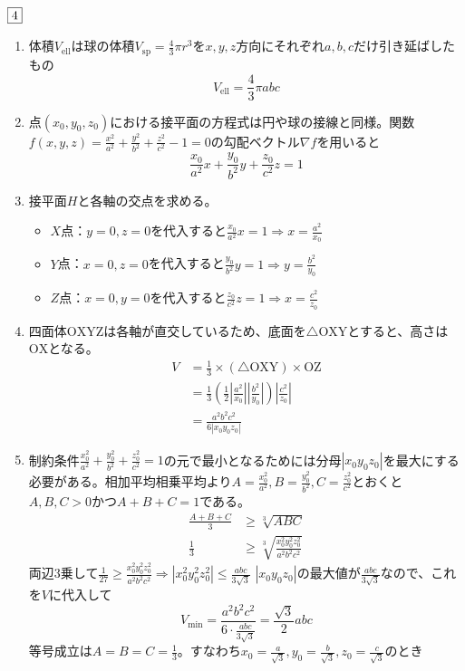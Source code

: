 \begin{souanswer} %
	$\fbox{4}$
\begin{enumerate}
	\item 体積$V_\mathrm{ell}$は球の体積$V_\mathrm{sp}= \frac{4}{3}\pi r^3$を$x, y, z$方向にそれぞれ$a, b, c$だけ引き延ばしたもの
\begin{equation*}
	V_\mathrm{ell}= \frac{4}{3}\pi abc
\end{equation*}

	\item 点$(x_0, y_0, z_0)$における接平面の方程式は円や球の接線と同様。関数$f(x, y, z)= \frac{x^2}{a^2}+ \frac{y^2}{b^2}+ \frac{z^2}{c^2}-1= 0$の勾配ベクトル$\nabla f$を用いると
\begin{equation*}
	\frac{x_0}{a^2}x+ \frac{y_0}{b^2}y+ \frac{z_0}{c^2}z= 1
\end{equation*}

	\item 接平面$H$と各軸の交点を求める。
\begin{itemize}
	\item $X$点：$y= 0, z= 0$を代入すると$\frac{x_0}{a^2}x= 1\Rightarrow x= \frac{a^2}{x_0}$
	\item $Y$点：$x= 0, z= 0$を代入すると$\frac{y_0}{b^2}y= 1\Rightarrow y= \frac{b^2}{y_0}$
	\item $Z$点：$x= 0, y= 0$を代入すると$\frac{z_0}{c^2}z= 1\Rightarrow x= \frac{c^2}{z_0}$
\end{itemize}

	\item 四面体$\mathrm{OXYZ}$は各軸が直交しているため、底面を$\triangle\mathrm{OXY}$とすると、高さは$\mathrm{OX}$となる。
\begin{align*}
	V
	&= \frac{1}{3}\times (\triangle\mathrm{OXY})\times \mathrm{OZ}\\
	&= \frac{1}{3}\left(\frac{1}{2}\left|\frac{a^2}{x_0}\right|\left|\frac{b^2}{y_0}\right|\right)\left|\frac{c^2}{z_0}\right|\\
	&= \frac{a^2b^2c^2}{6|x_0y_0z_0|}
\end{align*}

	\item 制約条件$\frac{x_0^2}{a^2}+ \frac{y_0^2}{b^2}+ \frac{z_0^2}{c^2}= 1$の元で最小となるためには分母$|x_0y_0z_0|$を最大にする必要がある。相加平均相乗平均より$A= \frac{x_0^2}{a^2}, B= \frac{y_0^2}{b^2}, C= \frac{z_0^2}{c^2}$とおくと$A, B, C> 0$かつ$A+ B+ C= 1$である。
\begin{align*}
	\frac{A+ B+ C}{3}&\ge \sqrt[3]{ABC}\\
	\frac{1}{3}&\ge \sqrt[3]{\frac{x_0^2y_0^2z_0^2}{a^2b^2c^2}}
\end{align*}
	両辺3乗して$\frac{1}{27}\ge \frac{x_0^2y_0^2z_0^2}{a^2b^2c^2}\Rightarrow |x_0^2y_0^2z_0^2|\le \frac{abc}{3\sqrt{3}}$
	$|x_0y_0z_0|$の最大値が$\frac{abc}{3\sqrt{3}}$なので、これを$V$に代入して
\begin{equation*}
	V_\mathrm{min}= \frac{a^2b^2c^2}{6\cdot \frac{abc}{3\sqrt{3}}}= \frac{\sqrt{3}}{2}abc
\end{equation*}
	等号成立は$A= B= C= \frac{1}{3}$。すなわち$x_0= \frac{a}{\sqrt{3}}, y_0= \frac{b}{\sqrt{3}}, z_0= \frac{c}{\sqrt{3}}$のとき

\end{enumerate}
\end{souanswer}